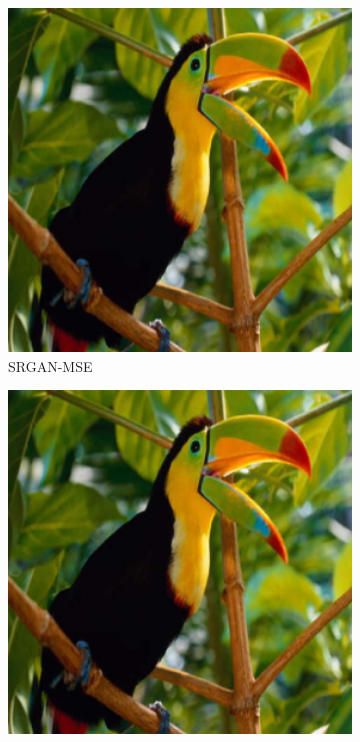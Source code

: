 \documentclass[12pt,onecolumn,oneside,titlepage]{article}
\begin{document}
\begin{figure}[H]
  \begin{subfigure}{0.3\textwidth}
  \includegraphics[width=1\textwidth]{bird_HR} 
  \caption{SRGAN-MSE}
  \end{subfigure}
  \begin{subfigure}{0.3\textwidth}
  \includegraphics[width=1\textwidth]{bird_HR}

\end{subfigure}
\end{figure}
\end{document}
